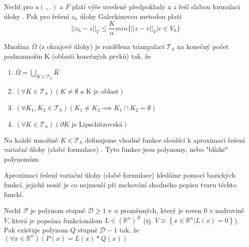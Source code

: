 \documentclass[../main.tex]{subfiles}
\begin{document}
    \begin{theorem}[Céova]
    

        Nechť pro $a(.,.)$ a $F$ platí výše uvedené předpoklady a $z$ řeší slabou formulaci úlohy . Pak pro řešení $z_h$ úlohy Galerkinovou metodou platí 
        \begin{equation}
            ||z_h - z||_V \leq \frac{K}{\alpha} min\{||z - v||_V | v\in V_h \}
        \end{equation} 
        \end{theorem}





        \begin{theorem}[MKP1]
            Množina $\bar{\Omega}$ (z okrajové úlohy) je rozdělena triangulací $\mathcal{T}_h$ na konečný počet podmmnožin K (oblastí konečných prvků) tak, že 
            \begin{enumerate}
                \item $\bar{\Omega} = \bigcup_{K\in\mathcal{T}_h} \bar{K}$
                \item $(\forall K  \in \mathcal{T}_h)(K\neq\emptyset \text{ a K je oblast})$
                \item $(\forall K_1, K_2 \in \mathcal{T}_h)(K_1 \neq K_2 \implies K_1 \cap K_2 = \emptyset)$
                \item $(\forall K \in \mathcal{T}_h) (\partial K \text{ je Lipschitzovská} )$
            \end{enumerate}
        \end{theorem}
        
        \begin{theorem}[MKP2]
            Na každé množině $K\in\mathcal{T}_h$ definujeme vhodné funkce sloužící k aproximaci řešení variační úlohy (slabé formulace) . Tyto funkce jsou polynomy, nebo "blízké" polynomům
        \end{theorem}
        
        
        \begin{theorem}[MKP3]
            Aproximaci řešení variační úlohy (slabé formulace)  hledáme pomocí bazických funkcí, jejichž nosič je co nejmenší při zachování shodného popisu tvaru těchto funckí. 
        \end{theorem}
        

        \begin{lemma}[O redukci]
            Nechť $\mathcal{P}$ je polynom stupně $\mathcal{D} \geq 1$ v $n$ proměnných, který je roven $0$ v nadrovině $V$, která je popsána funkcionálem $L\in(\mathbb{R}^n)^\#$ (tj. $V\equiv \left\{x\in\mathbb{R}^n| L(x)= 0\right\}$).
            Pak existuje polynom $Q$ stupně $\mathcal{D} - 1$ tak, že $(\forall x\in\mathbb{R}^n)(P(x) = L(x)*Q(x))$    
        \end{lemma}
\end{document}
